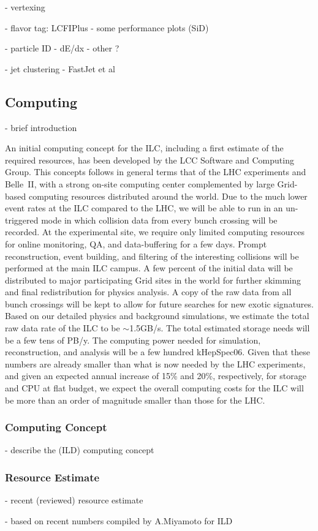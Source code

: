- vertexing

- flavor tag: LCFIPlus
  - some performance plots (SiD)

- particle ID
  - dE/dx
  - other  ?

- jet clustering
  - FastJet et al


\subsection{Computing}

- brief introduction 

An initial computing concept for the ILC, including a first estimate of the required resources, has been developed by the LCC Software and Computing Group.
This concepts follows in general terms that of the LHC experiments and
Belle~II,  with a strong on-site computing center complemented by large
Grid-based computing resources distributed around the world. Due to the much lower event rates at the ILC compared to the LHC, we will be
able to run in an un-triggered mode in which  collision data from every bunch crossing will be recorded. At the experimental site, we require only limited computing
resources for online monitoring, QA, and data-buffering for a few
days.
 Prompt reconstruction, event building, and filtering of the interesting collisions
will be performed at the main ILC campus.
A few percent of the initial data will be distributed to major participating Grid sites
in the world for further skimming and final redistribution for physics
analysis. A copy of the raw data from all bunch crossings will be kept
to allow
 for future searches for new exotic signatures. 
Based on our detailed physics and background simulations,
 we estimate the total raw data rate of the ILC to be $\sim$1.5GB/s.
The total estimated storage needs will be a few tens of PB/y.
The computing power needed for simulation, reconstruction, and analysis will be a few hundred kHepSpec06.
Given that these numbers are already smaller than what is now
needed by the LHC experiments, and given an expected annual increase
of 15\% and 20\%, respectively, for storage and CPU
at flat budget, we expect the overall computing costs for the ILC
will be more than an order of magnitude smaller than those for the LHC.


\subsubsection{Computing Concept}

- describe the (ILD) computing concept 

\subsubsection{Resource Estimate}

- recent (reviewed) resource estimate

- based on recent  numbers compiled by A.Miyamoto for ILD




